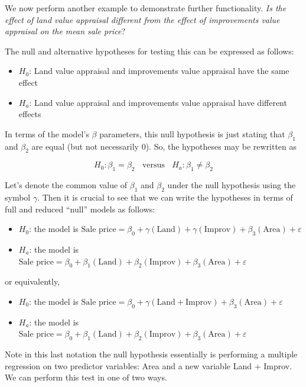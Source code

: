 \documentclass[
]{book}
\providecommand{\tightlist}{%
  \setlength{\itemsep}{0pt}\setlength{\parskip}{0pt}}
\begin{document}
We now perform another example to demonstrate further functionality. \emph{Is the effect of land value appraisal different from the effect of improvements value appraisal on the mean sale price}?

The null and alternative hypotheses for testing this can be expressed as follows:

\begin{itemize}
\tightlist
\item
  \(H_0\): Land value appraisal and improvements value appraisal have the same effect
\item
  \(H_a\): Land value appraisal and improvements value appraisal have different effects
\end{itemize}

In terms of the model's \(\beta\) parameters, this null hypothesis is just stating that \(\beta_1\) and \(\beta_2\) are equal (but not necessarily 0). So, the hypotheses may be rewritten as

\[H_0: \beta_1 = \beta_2 ~~~~\textrm{versus}~~~~ H_a: \beta_1 \neq \beta_2\]

Let's denote the common value of \(\beta_1\) and \(\beta_2\) under the null hypothesis using the symbol \(\gamma\). Then it is crucial to see that we can write the hypotheses in terms of full and reduced ``null'' models as follows:

\begin{itemize}
\tightlist
\item
  \(H_0\): the model is \(\textrm{Sale price} = \beta_0 + \gamma(\textrm{Land}) + \gamma(\textrm{Improv}) + \beta_3(\textrm{Area}) + \varepsilon\)
\item
  \(H_a\): the model is \(\textrm{Sale price} = \beta_0 + \beta_1(\textrm{Land}) + \beta_2(\textrm{Improv}) + \beta_3(\textrm{Area}) + \varepsilon\)
\end{itemize}

or equivalently,

\begin{itemize}
\tightlist
\item
  \(H_0\): the model is \(\textrm{Sale price} = \beta_0 + \gamma(\textrm{Land} + \textrm{Improv}) + \beta_3(\textrm{Area}) + \varepsilon\)
\item
  \(H_a\): the model is \(\textrm{Sale price} = \beta_0 + \beta_1(\textrm{Land}) + \beta_2(\textrm{Improv}) + \beta_3(\textrm{Area}) + \varepsilon\)
\end{itemize}

Note in this last notation the null hypothesis essentially is performing a multiple regression on two predictor variables: Area and a new variable Land + Improv. We can perform this test in one of two ways.
\end{document}
